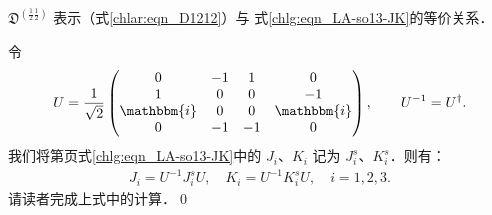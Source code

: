 \begin{example}
	$\mathfrak{D}^{(\frac{1}{2}\frac{1}{2})}$ 表示（式\eqref{chlar:eqn_D1212}）与
	式\eqref{chlg:eqn_LA-so13-JK}的等价关系．
\end{example}
令
\begin{align} 
	U=\frac{1}{\sqrt{2}}
	\begin{pmatrix}
		0 & -1 & 1 & 0 \\
		1 & 0 & 0 & -1 \\
		\mathbbm{i} & 0 & 0 & \mathbbm{i} \\
		0 & -1 & -1 & 0 
	\end{pmatrix},\qquad
	U^{-1} = U^\dagger .
\end{align}
我们将第\pageref{chlg:eqn_LA-so13-JK}页式\eqref{chlg:eqn_LA-so13-JK}中的 $J_i$、$K_i$ 记为 $J_i^s$、$K_i^s$．则有：
\begin{align}
	J_i = U^{-1} J_i^s U, \quad K_i = U^{-1} K_i^s U,  \quad i = 1,2,3.
\end{align}
请读者完成上式中的计算．\qed

